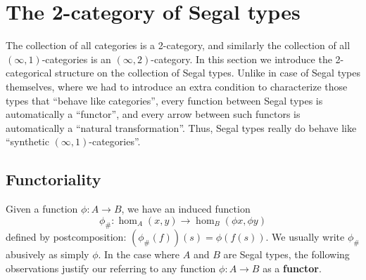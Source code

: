 \documentclass[12pt]{amsart}
\theoremstyle{plain}
\theoremstyle{definition}
\theoremstyle{remark}
\numberwithin{equation}{section}
\newcommand{\exten}[4]{\left\langle\mathchoice{\textstyle\prod_{#1}}{\textstyle\prod_{#1}}{\scriptstyle\prod_{#1}}{\scriptscriptstyle\prod_{#1}} #2 \middle|^{#3}_{#4}\right\rangle}
\newcommand{\extfn}[1]{{#1}_\#}
\newcommand{\jdeq}{\equiv}
\newcommand{\cb}{\mid}          %
\newcommand{\coftypes}{\mathrel{\mathord{\rangle}\!\!\joinrel\relbar}}
\newcommand{\types}{\vdash}
\newcommand{\subst}[2]{[#1/#2]}
\newcommand{\type}{\;\mathsf{type}}
\begin{document}
\section{The 2-category of Segal types}
\label{sec:2cat-segal}

The collection of all categories is a 2-category, and similarly the collection of all $(\infty,1)$-categories is an $(\infty,2)$-category.
In this section we introduce the 2-categorical structure on the collection of Segal types.
Unlike in case of Segal types themselves, where we had to introduce an extra condition to characterize those types that ``behave like categories'', every function between Segal types is automatically a ``functor'', and every arrow between such functors is automatically a ``natural transformation''.
Thus, Segal types really do behave like ``synthetic $(\infty,1)$-categories''.

\subsection{Functoriality}
\label{sec:functoriality}


Given a function $\phi : A \to B$, we have an induced function
\[ \extfn \phi: \hom_A(x,y) \to \hom_{B}(\phi x, \phi y)\]
defined by postcomposition: $(\extfn \phi(f))(s) = \phi(f(s))$.
We usually write $\extfn \phi$ abusively as simply $\phi$.
In the case where $A$ and $B$ are Segal types, the following observations justify our referring to any function $\phi : A \to B$ as a \textbf{functor}.
\end{document}
